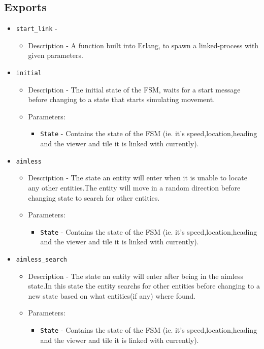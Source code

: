 \subsection{Exports}
\begin{itemize}
\item {\tt start\_link} -
\begin{itemize}
\item Description - A function built into Erlang, to spawn a linked-process with given parameters.
\end{itemize}
\item {\tt initial}
\begin{itemize}
\item Description - The initial state of the FSM, waits for a start message before changing to a state that starts simulating movement.
\item Parameters:
\begin{itemize}
\item {\tt State} - Contains the state of the FSM (ie. it's speed,location,heading and the viewer and tile it is linked with currently).
\end{itemize}
\end{itemize}
\item {\tt aimless}
\begin{itemize}
\item Description - The state an entity will enter when it is unable to locate any other entities.The entity will move in a random direction before changing state to search for other entities.
\item Parameters:
\begin{itemize}
\item {\tt State} - Contains the state of the FSM (ie. it's speed,location,heading and the viewer and tile it is linked with currently).
\end{itemize}
\end{itemize}
\item {\tt aimless\_search}
\begin{itemize}
\item Description - The state an entity will enter after being in the aimless state.In this state the entity searchs for other entities before changing to a new state based on what entities(if any) where found.
\item Parameters:
\begin{itemize}
\item {\tt State} - Contains the state of the FSM (ie. it's speed,location,heading and the viewer and tile it is linked with currently).

\end{itemize}
\end{itemize}
\end{itemize}

